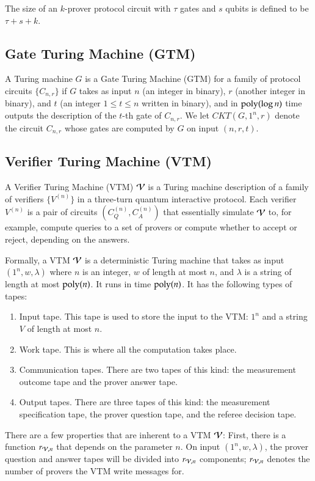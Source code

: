 The size of an $k$-prover protocol circuit with $\tau$ gates and $s$ qubits is defined to be $\tau + s + k$.


\subsection{Gate Turing Machine (GTM)} 
A Turing machine $G$ is a Gate Turing Machine (GTM) for a family of protocol circuits $\{C_{n,r}\}$ if $G$ takes as input $n$ (an integer in binary), $r$ (another integer in binary), and $t$ (an integer $1\leq t\leq n$ written in binary), and in $\operatorname{poly}(\log n)$ time outputs the description of the $t$-th gate of $C_{n,r}$. We let $CKT(G,1^n,r)$ denote the circuit $C_{n,r}$ whose gates are computed by $G$ on input $(n,r,t)$.

\subsection{Verifier Turing Machine (VTM)} 
\label{sec:vtm}

A Verifier Turing Machine (VTM) $\mathcal V$ is a Turing machine description of a family of verifiers $\{V^{(n)}\}$ in a three-turn quantum interactive protocol. Each verifier $V^{(n)}$ is a pair of circuits $(C_Q^{(n)},C_A^{(n)})$ that essentially simulate $\mathcal V$ to, for example, compute queries to a set of provers or compute whether to accept or reject, depending on the answers.

Formally, a VTM $\mathcal V$ is a deterministic Turing machine that takes as input $(1^n,w,\lambda)$ where $n$ is an integer, $w$ of length at most $n$, and $\lambda$ is a string of length at most $\operatorname{poly}(n)$. It runs in time $\operatorname{poly}(n)$.  It has the following types of tapes:
\begin{enumerate}
	\item Input tape. This tape is used to store the input to the VTM: $1^n$ and a string $V$ of length at most $n$. 
	\item Work tape. This is where all the computation takes place.
	\item Communication tapes. There are two tapes of this kind: the measurement outcome tape and the prover answer tape. 
	\item Output tapes. There are three tapes of this kind: the measurement specification tape, the prover question tape, and the referee decision tape. 
\end{enumerate}
There are a few properties that are inherent to a VTM $\mathcal V$: First, there is a function $r_{\mathcal V,n}$ that depends on the parameter $n$. On input $(1^n,w,\lambda)$, the prover question and answer tapes will be divided into $r_{\mathcal V,n}$ components; $r_{\mathcal V,n}$ denotes the number of provers the VTM write messages for. 

